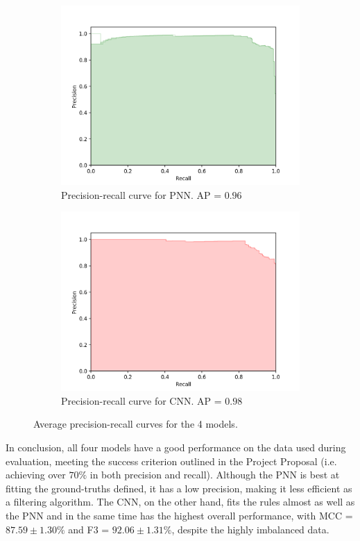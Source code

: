 \begin{figure}[H]
			\begin{subfigure}{.4\textwidth}
				\includegraphics[width=\textwidth]{graphics/precision-recall/pnn}
				\caption{Precision-recall curve for PNN. AP = $0.96$}
				\label{Fig: eval/ml/results/precision-recall/pnn}
			\end{subfigure} \hfill
			\begin{subfigure}{.4\textwidth}
				\includegraphics[width=\textwidth]{graphics/precision-recall/cnn}
				\caption{Precision-recall curve for CNN. AP = $0.98$}
				\label{Fig: eval/ml/results/precision-recall/cnn}
			\end{subfigure}
			\caption{Average precision-recall curves for the 4 models.}
			\label{Fig: eval/ml/results/precision-recall}
		\end{figure}
			In conclusion, all four models have a good performance on the data used during evaluation, meeting the success criterion outlined in the Project Proposal (i.e. achieving over $70\%$ in both precision and recall). Although the PNN is best at fitting the ground-truths defined, it has a low  precision, making it less efficient as a filtering algorithm. The CNN, on the other hand, fits the rules almost as well as the PNN and in the same time has the highest overall performance, with  MCC = $87.59 \pm 1.30 \%$ and F3 = $92.06 \pm 1.31 \%$, despite the highly imbalanced data.
			

